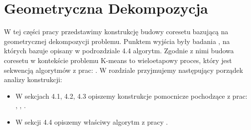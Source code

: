 \chapter{Geometryczna Dekompozycja}\label{geo}
W tej części pracy przedstawimy konstrukcję budowy coresetu bazującą na geometrycznej dekompozycji problemu.
Punktem wyjścia były badania \cite{DBLP:journals/ki/MunteanuS18}, na których bazuje opisany w podrozdziale 4.4 algorytm.
Zgodnie z nimi budowa coresetu w kontekście problemu K-means to wieloetapowy proces, który jest sekwencją algorytmów z prac: \cite{Gonzalez1985ClusteringTM} \cite{10.1145/1007352.1007400} \cite{Arya2004LocalSH} \cite{DBLP:journals/ki/MunteanuS18}.
W rozdziale przyjmujemy następujący porządek analizy konstrukcji:
\begin{itemize}
    \item W sekcjach 4.1, 4.2, 4.3 opiszemy konstrukcje pomocnicze pochodzące z prac: \cite{Gonzalez1985ClusteringTM}, \cite{10.1145/1007352.1007400}, \cite{Arya2004LocalSH}.
    \item W sekcji 4.4 opiszemy właściwy algorytm z pracy \cite{DBLP:journals/ki/MunteanuS18}.
\end{itemize}






